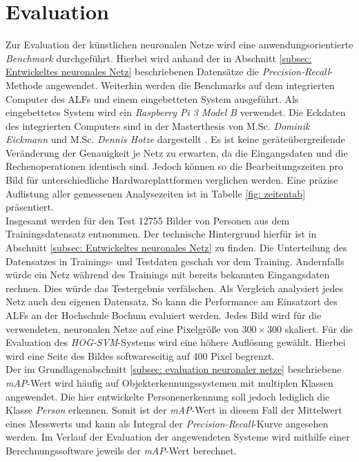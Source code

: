 \chapter{Evaluation}
\label{ch: Verifikation}
Zur Evaluation der künstlichen neuronalen Netze wird eine anwendungsorientierte \textit{Benchmark} durchgeführt. Hierbei wird anhand der in Abschnitt \ref{subsec: Entwickeltes neuronales Netz} beschriebenen Datensätze die \textit{Precision-Recall}-Methode angewendet. Weiterhin werden die Benchmarks auf dem integrierten Computer des ALFs und einem eingebetteten System ausgeführt. Als eingebettetes System wird ein \textit{Raspberry Pi 3 Model B} verwendet. Die Eckdaten des integrierten Computers sind in der Masterthesis von M.Sc. \textit{Dominik Eickmann} und M.Sc. \textit{Dennis Hotze} dargestellt \cite{alf}. Es ist keine geräteübergreifende Veränderung der Genauigkeit je Netz zu erwarten, da die Eingangsdaten und die Rechenoperationen identisch sind. Jedoch können so die Bearbeitungszeiten pro Bild für unterschiedliche Hardwareplattformen verglichen werden. Eine präzise Auflistung aller gemessenen Analysezeiten ist in Tabelle \ref{fig: zeitentab} präsentiert. \\

Insgesamt werden für den Test 12755 Bilder von Personen aus dem Trainingsdatensatz entnommen. Der technische Hintergrund hierfür ist in Abschnitt \ref{subsec: Entwickeltes neuronales Netz} zu finden. Die Unterteilung des Datensatzes in Trainings- und Testdaten geschah vor dem Training. Andernfalls würde ein Netz während des Trainings mit bereits bekannten Eingangsdaten rechnen. Dies würde das Testergebnis verfälschen. Als Vergleich analysiert jedes Netz auch den eigenen Datensatz. So kann die Performance am Einsatzort des ALFs an der Hochschule Bochum evaluiert werden. Jedes Bild wird für die verwendeten, neuronalen Netze auf eine Pixelgröße von $300 \times 300$ skaliert. Für die Evaluation des \textit{HOG-SVM}-Systems wird eine höhere Auflösung gewählt. Hierbei wird eine Seite des Bildes softwareseitig auf 400 Pixel begrenzt. \\

Der im Grundlagenabschnitt \ref{subsec: evaluation neuronaler netze} beschriebene \textit{mAP}-Wert wird häufig auf Objekterkennungssystemen mit multiplen Klassen angewendet. Die hier entwickelte Personenerkennung soll jedoch lediglich die Klasse \textit{Person} erkennen. Somit ist der \textit{mAP}-Wert in diesem Fall der Mittelwert eines Messwerts und kann als Integral der \textit{Precision-Recall}-Kurve angesehen werden. Im Verlauf der Evaluation der angewendeten Systeme wird mithilfe einer Berechnungssoftware jeweils der \textit{mAP}-Wert berechnet.
 
